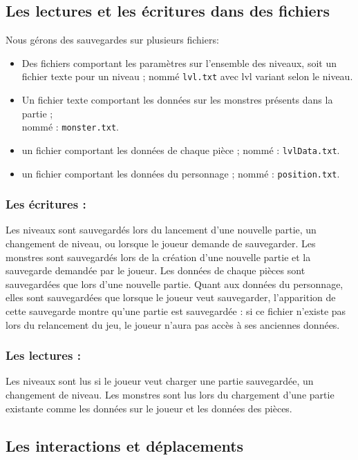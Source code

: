 \documentclass[11pt]{report}
\begin{document}
		\subsection{Les lectures et les écritures dans des fichiers}
		
		Nous gérons des sauvegardes sur plusieurs fichiers:
		\begin{itemize}
			\item Des fichiers comportant les paramètres sur l'ensemble des niveaux, soit un fichier texte pour un niveau ; nommé \texttt{lvl.txt} avec lvl variant selon le niveau.
			\item Un fichier texte comportant les données sur les monstres présents dans la partie ; \\ nommé : \texttt{monster.txt}.
			\item un fichier comportant les données de chaque pièce ; nommé : \texttt{lvlData.txt}.
			\item un fichier comportant les données du personnage ; nommé : \texttt{position.txt}.
		\end{itemize} 
		\subsubsection{Les écritures :}
		Les niveaux sont sauvegardés lors du lancement d'une nouvelle partie, un changement de niveau, ou lorsque le joueur demande de sauvegarder. Les monstres sont sauvegardés lors de la création d'une nouvelle partie et la sauvegarde demandée par le joueur. Les données de chaque pièces sont sauvegardées que lors d'une nouvelle partie. Quant aux données du personnage, elles sont sauvegardées que lorsque le joueur veut sauvegarder, l'apparition de cette sauvegarde montre qu'une partie est sauvegardée : si ce fichier n'existe pas lors du relancement du jeu, le joueur n'aura pas accès à ses anciennes données.

		\subsubsection{Les lectures :}
		Les niveaux sont lus si le joueur veut charger une partie sauvegardée, un changement de niveau. Les monstres sont lus lors du chargement d'une partie existante comme les données sur le joueur et les données des pièces.

		\subsection{Les interactions et déplacements}\label{ncurses}
\end{document}
